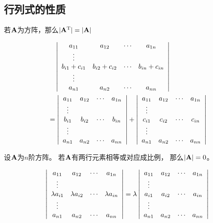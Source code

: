 \subsection{行列式的性质}
\begin{theorem}
  若$\mmA$为方阵，那么$|\mmA^\mT| = |\mmA|$
\end{theorem}

\begin{theorem}
  \begin{align*}
    &\quad\mdet{cccc}{
      a_{11} & a_{12} & \cdots & a_{1n} \\
      \vdots &        &        &        \\
      b_{i1} + c_{i1} & b_{i2} + c_{i2}  & \cdots & b_{in} + c_{in} \\
      \vdots &        &        &        \\
      a_{n1} & a_{n2} & \cdots & a_{nn} } \\
    &= \mdet{cccc}{
      a_{11} & a_{12} & \cdots & a_{1n} \\
      \vdots &        &        &        \\
      b_{i1} & b_{i2} & \cdots & b_{in} \\
      \vdots &        &        &        \\
      a_{n1} & a_{n2} & \cdots & a_{nn} }
    + \mdet{cccc}{
      a_{11} & a_{12} & \cdots & a_{1n} \\
      \vdots &        &        &        \\
      c_{i1} & c_{i2} & \cdots & c_{in} \\
      \vdots &        &        &        \\
      a_{n1} & a_{n2} & \cdots & a_{nn} }
    \end{align*}
\end{theorem}

\begin{theorem}
  设$\mmA$为$n$阶方阵。
  若$\mmA$有两行元素相等或对应成比例，
  那么$|\mmA| = 0$。
\end{theorem}

\begin{theorem}
  \begin{displaymath}
    \mdet{cccc}{
      a_{11} & a_{12} & \cdots & a_{1n} \\
      \vdots &        &        &        \\
      \lambda a_{i1} & \lambda a_{i2} & \cdots & \lambda a_{in} \\
      \vdots &        &        &        \\
      a_{n1} & a_{n2} & \cdots & a_{nn} }
    = \lambda \mdet{cccc}{
      a_{11} & a_{12} & \cdots & a_{1n} \\
      \vdots &        &        &        \\
      a_{i1} & a_{i2} & \cdots & a_{in} \\
      \vdots &        &        &        \\
      a_{n1} & a_{n2} & \cdots & a_{nn} }
  \end{displaymath}
\end{theorem}


